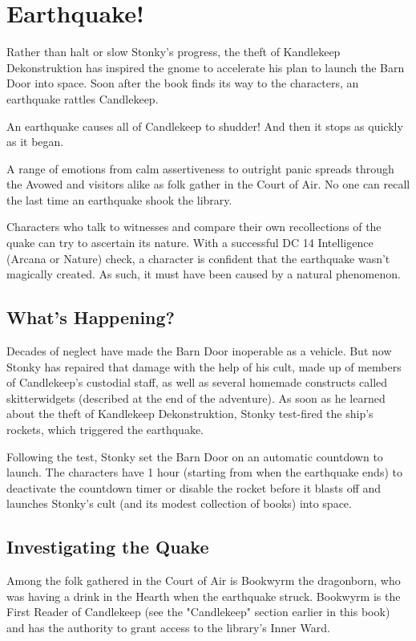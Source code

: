 \documentclass[10pt,a4paper,twoside,bg=print,twocolumn,openany,nodeprecatedcode]{dndbook}
\begin{document}
\section{Earthquake!}
Rather than halt or slow Stonky's progress, the theft of Kandlekeep Dekonstruktion has inspired the gnome to accelerate his plan to launch the Barn Door into space. Soon after the book finds its way to the characters, an earthquake rattles Candlekeep.

\begin{DndReadAloud}{}
An earthquake causes all of Candlekeep to shudder! And then it stops as quickly as it began.

\end{DndReadAloud}

A range of emotions from calm assertiveness to outright panic spreads through the Avowed and visitors alike as folk gather in the Court of Air. No one can recall the last time an earthquake shook the library.

Characters who talk to witnesses and compare their own recollections of the quake can try to ascertain its nature. With a successful DC 14 Intelligence (Arcana or Nature) check, a character is confident that the earthquake wasn't magically created. As such, it must have been caused by a natural phenomenon.

\subsection{What's Happening?}
Decades of neglect have made the Barn Door inoperable as a vehicle. But now Stonky has repaired that damage with the help of his cult, made up of members of Candlekeep's custodial staff, as well as several homemade constructs called skitterwidgets (described at the end of the adventure). As soon as he learned about the theft of Kandlekeep Dekonstruktion, Stonky test-fired the ship's rockets, which triggered the earthquake.

Following the test, Stonky set the Barn Door on an automatic countdown to launch. The characters have 1 hour (starting from when the earthquake ends) to deactivate the countdown timer or disable the rocket before it blasts off and launches Stonky's cult (and its modest collection of books) into space.

\subsection{Investigating the Quake}
Among the folk gathered in the Court of Air is Bookwyrm the dragonborn, who was having a drink in the Hearth when the earthquake struck. Bookwyrm is the First Reader of Candlekeep (see the "Candlekeep" section earlier in this book) and has the authority to grant access to the library's Inner Ward.
\end{document}
